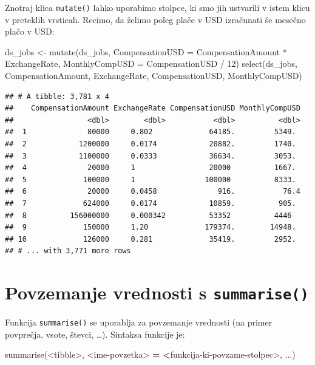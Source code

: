 \documentclass[
]{book}
\newenvironment{Shaded}{\begin{snugshade}}{\end{snugshade}}
\newcommand{\AttributeTok}[1]{\textcolor[rgb]{0.77,0.63,0.00}{#1}}
\newcommand{\DecValTok}[1]{\textcolor[rgb]{0.00,0.00,0.81}{#1}}
\newcommand{\ErrorTok}[1]{\textcolor[rgb]{0.64,0.00,0.00}{\textbf{#1}}}
\newcommand{\FunctionTok}[1]{\textcolor[rgb]{0.00,0.00,0.00}{#1}}
\newcommand{\NormalTok}[1]{#1}
\newcommand{\OtherTok}[1]{\textcolor[rgb]{0.56,0.35,0.01}{#1}}
\newcommand{\SpecialCharTok}[1]{\textcolor[rgb]{0.00,0.00,0.00}{#1}}
\begin{document}
Znotraj klica \texttt{mutate()} lahko uporabimo stolpce, ki smo jih ustvarili v istem klicu v preteklih vrsticah. Recimo, da želimo poleg plače v USD izračunati še mesečno plačo v USD:

\begin{Shaded}
\begin{Highlighting}[]
\NormalTok{ds\_jobs }\OtherTok{\textless{}{-}} \FunctionTok{mutate}\NormalTok{(ds\_jobs, }
                  \AttributeTok{CompensationUSD =}\NormalTok{ CompensationAmount }\SpecialCharTok{*}\NormalTok{ ExchangeRate,}
                  \AttributeTok{MonthlyCompUSD  =}\NormalTok{ CompensationUSD }\SpecialCharTok{/} \DecValTok{12}\NormalTok{)}
\FunctionTok{select}\NormalTok{(ds\_jobs, CompensationAmount, ExchangeRate, CompensationUSD, MonthlyCompUSD)}
\end{Highlighting}
\end{Shaded}

\begin{verbatim}
## # A tibble: 3,781 x 4
##    CompensationAmount ExchangeRate CompensationUSD MonthlyCompUSD
##                 <dbl>        <dbl>           <dbl>          <dbl>
##  1              80000     0.802             64185.         5349. 
##  2            1200000     0.0174            20882.         1740. 
##  3            1100000     0.0333            36634.         3053. 
##  4              20000     1                 20000          1667. 
##  5             100000     1                100000          8333. 
##  6              20000     0.0458              916.           76.4
##  7             624000     0.0174            10859.          905. 
##  8          156000000     0.000342          53352          4446  
##  9             150000     1.20             179374.        14948. 
## 10             126000     0.281             35419.         2952. 
## # ... with 3,771 more rows
\end{verbatim}

\hypertarget{povzemanje-vrednosti-s-summarise}{%
\section{\texorpdfstring{Povzemanje vrednosti s \texttt{summarise()}}{Povzemanje vrednosti s summarise()}}\label{povzemanje-vrednosti-s-summarise}}

Funkcija \texttt{summarise()} se uporablja za povzemanje vrednosti (na primer povprečja, vsote, števci, \ldots). Sintaksa funkcije je:

\begin{Shaded}
\begin{Highlighting}[]
\FunctionTok{summarise}\NormalTok{(}\SpecialCharTok{\textless{}}\NormalTok{tibble}\SpecialCharTok{\textgreater{}}\NormalTok{, }\SpecialCharTok{\textless{}}\NormalTok{ime}\SpecialCharTok{{-}}\NormalTok{povzetka}\SpecialCharTok{\textgreater{}} \ErrorTok{=} \ErrorTok{\textless{}}\NormalTok{funkcija}\SpecialCharTok{{-}}\NormalTok{ki}\SpecialCharTok{{-}}\NormalTok{povzame}\SpecialCharTok{{-}}\NormalTok{stolpec}\SpecialCharTok{\textgreater{}}\NormalTok{, ...)}
\end{Highlighting}
\end{Shaded}
\end{document}
